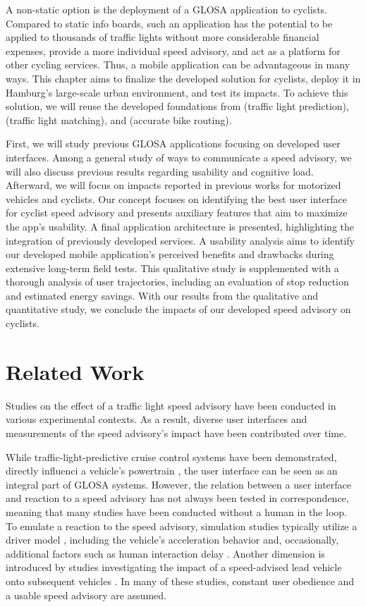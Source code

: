 A non-static option is the deployment of a GLOSA application to cyclists. Compared to static info boards, such an application has the potential to be applied to thousands of traffic lights without more considerable financial expenses, provide a more individual speed advisory, and act as a platform for other cycling services. Thus, a mobile application can be advantageous in many ways. This chapter aims to finalize the developed solution for cyclists, deploy it in Hamburg's large-scale urban environment, and test its impacts. To achieve this solution, we will reuse the developed foundations from  (traffic light prediction),  (traffic light matching), and  (accurate bike routing).

First, we will study previous GLOSA applications focusing on developed user interfaces. Among a general study of ways to communicate a speed advisory, we will also discuss previous results regarding usability and cognitive load. Afterward, we will focus on impacts reported in previous works for motorized vehicles and cyclists. Our concept focuses on identifying the best user interface for cyclist speed advisory and presents auxiliary features that aim to maximize the app's usability. A final application architecture is presented, highlighting the integration of previously developed services. A usability analysis aims to identify our developed mobile application's perceived benefits and drawbacks during extensive long-term field tests. This qualitative study is supplemented with a thorough analysis of user trajectories, including an evaluation of stop reduction and estimated energy savings. With our results from the qualitative and quantitative study, we conclude the impacts of our developed speed advisory on cyclists. 

\section{Related Work}

Studies on the effect of a traffic light speed advisory have been conducted in various experimental contexts. As a result, diverse user interfaces and measurements of the speed advisory's impact have been contributed over time. 

While traffic-light-predictive cruise control systems have been demonstrated, directly influenci a vehicle's powertrain \cite{raubitschek_predictive_2011}, the user interface can be seen as an integral part of GLOSA systems. However, the relation between a user interface and reaction to a speed advisory has not always been tested in correspondence, meaning that many studies have been conducted without a human in the loop. To emulate a reaction to the speed advisory, simulation studies typically utilize a driver model \cite{hu_lane-level_2023}, including the vehicle's acceleration behavior and, occasionally, additional factors such as human interaction delay \cite{schlamp_2023_glosa}. Another dimension is introduced by studies investigating the impact of a speed-advised lead vehicle onto subsequent vehicles \cite{preuk_does_2016, preuk_should_2018}. In many of these studies, constant user obedience and a usable speed advisory are assumed.

